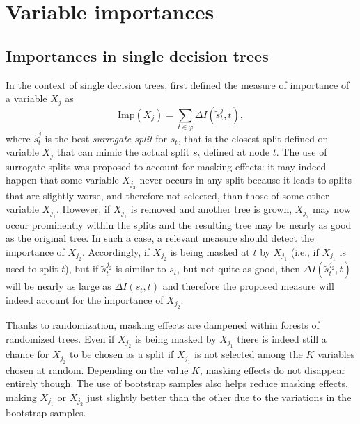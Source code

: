 

\section{Variable importances}
\label{sec:6:importances}

\subsection{Importances in single decision trees}

In the context of single decision trees, \cite{breiman:1984} first defined
the measure of importance of a variable $X_j$ as
\begin{equation}
\text{Imp}(X_j) = \sum_{t\in \varphi} \Delta I(\tilde{s}^j_t, t),
\end{equation}
where $\tilde{s}^j_t$\label{ntn:s-surrogate} is the best \textit{surrogate split}
for $s_t$, that is the closest split defined on variable $X_j$ that can mimic the actual
split $s_t$ defined at node $t$. The use of surrogate splits was proposed to
account for masking effects: it may indeed happen that some variable $X_{j_2}$
never occurs in any split because it leads to splits that are slightly worse,
and therefore not selected, than those of some other variable $X_{j_1}$.
However, if $X_{j_1}$ is removed and another tree is grown, $X_{j_2}$ may now
occur prominently within the splits and the resulting tree may be nearly as good
as the original tree. In such a case, a relevant measure should detect the
importance of $X_{j_2}$. Accordingly, if $X_{j_2}$ is being masked at $t$ by
$X_{j_1}$ (i.e., if $X_{j_1}$ is used to split $t$), but if $\tilde{s}^{j_2}_t$ is similar to
$s_t$, but not quite as good, then $\Delta I(\tilde{s}^{j_2}_t, t)$ will be
nearly as large as $\Delta I(s_t, t)$ and therefore the proposed measure will
indeed account for the importance of $X_{j_2}$.

Thanks to randomization, masking effects are dampened within forests of
randomized trees. Even if $X_{j_2}$ is being masked by $X_{j_1}$ there is indeed
still a chance for $X_{j_2}$ to be chosen as a split if $X_{j_1}$ is not
selected among the $K$ variables chosen at random. Depending on the value $K$,
masking effects do not disappear entirely though. The use of bootstrap samples
also helps reduce masking effects, making $X_{j_1}$ or $X_{j_2}$ just slightly
better than the other due to the variations in the bootstrap samples.

